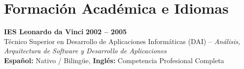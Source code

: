 \documentclass[10pt,a4paper]{article}
\begin{document}
\section{Formación Académica e Idiomas}
\noindent\textbf{IES Leonardo da Vinci} \hfill {\textbf{2002 -- 2005}} \\
Técnico Superior en Desarrollo de Aplicaciones Informáticas (DAI) -- \textit{Análisis, Arquitectura de Software y Desarrollo de Aplicaciones}\\

\vspace{6pt}
\noindent \textbf{Español:} Nativo / Bilingüe, \textbf{Inglés:} Competencia Profesional Completa
\end{document}
